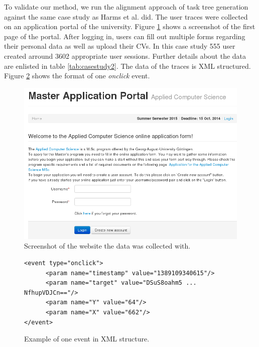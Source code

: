 To validate our method, we run the alignment approach of task tree generation against the same case study as Harms et al. did.
The user traces were collected on an application portal of the university.
Figure \ref{fig:screenshotmasterportal} shows a screenshot of the first page of the portal.
After logging in, users can fill out multiple forms regarding their personal data as well as upload their CVs.
In this case study 555 user created arround 3602 appropriate user sessions.
Further details about the data are enlisted in table \ref{tab:casestudy2}.
The data of the traces is XML structured. 
Figure \ref{fig:xml} shows the format of one \textit{onclick} event. 
\begin{figure}[h]
	\includegraphics[width=\textwidth]{chapters/casestudy/masterportalscreenshot.png}
	\caption{Screenshot of the website the data was collected with.}
	\label{fig:screenshotmasterportal}
\end{figure}
\begin{figure}
\begin{verbatim}
<event type="onclick">
      <param name="timestamp" value="1389109340615"/>
      <param name="target" value="DSuS8oahm5 ... NfhupVDJCn=="/>
      <param name="Y" value="64"/>
      <param name="X" value="662"/>
</event>
\end{verbatim}
\caption{Example of one event in XML structure.}
\label{fig:xml}
\end{figure}

